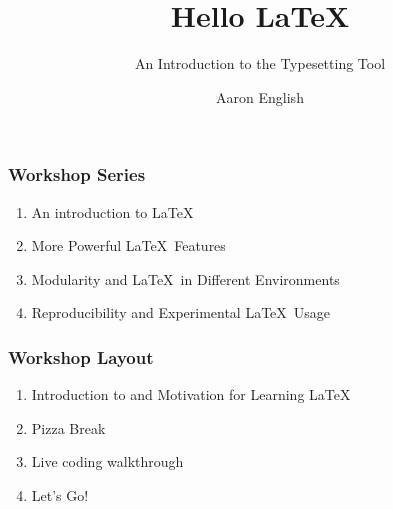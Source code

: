 \documentclass{beamer}
\title{Hello \LaTeX}
\subtitle{An Introduction to the Typesetting Tool}
\author{Aaron English}
\date{\DTMusedate{presentation}}
\begin{document}
    \begin{frame}
        \titlepage
    \end{frame}
        \begin{frame}
            \frametitle{Workshop Series}
            \begin{enumerate}[Workshop 1:]
                \addtolength{\itemindent}{4em}
                \item An introduction to \LaTeX
                \item More Powerful \LaTeX~Features
                \item Modularity and \LaTeX~in Different Environments
                \item Reproducibility and Experimental \LaTeX~Usage
            \end{enumerate}
        \end{frame}
        \begin{frame}
            \frametitle{Workshop Layout}
            \begin{enumerate}
                \item Introduction to and Motivation for Learning \LaTeX
                \item Pizza Break
                \item Live coding walkthrough
                \item Let's Go!
            \end{enumerate}
        \end{frame}
\end{document}
